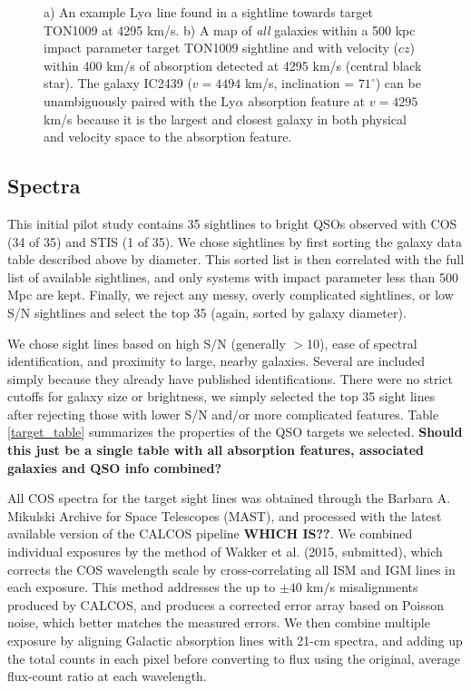 \documentclass[iop]{emulateapj-rtx4}
\begin{document}
\begin{figure}[h!]
  \caption{\small{a) An example Ly$\alpha$ line found in a sightline towards target TON1009 at 4295 km/s. b) A map of \textit{all} galaxies within a 500 kpc impact parameter target TON1009 sightline and with velocity ($cz$) within 400 km/s of absorption detected at 4295 km/s (central black star). The galaxy IC2439 ($v=4494$ km/s, inclination = $71^{\circ}$) can be unambiguously paired with the Ly$\alpha$ absorption feature at $v=4295$ km/s because it is the largest and closest galaxy in both physical and velocity space to the absorption feature.}}
\vspace{5pt}
\end{figure}

\subsection{Spectra}

This initial pilot study contains 35 sightlines to bright QSOs observed with COS (34 of 35) and STIS (1 of 35). We chose sightlines by first sorting the galaxy data table described above by diameter. This sorted list is then correlated with the full list of available sightlines, and only systems with impact parameter less than 500 Mpc are kept. Finally, we reject any messy, overly complicated sightlines, or low S/N sightlines and select the top 35 (again, sorted by galaxy diameter). 

We chose sight lines based on high S/N (generally $>$10), ease of spectral identification, and proximity to large, nearby galaxies. Several are included simply because they already have published identifications. There were no strict cutoffs for galaxy size or brightness, we simply selected the top 35 sight lines after rejecting those with lower S/N and/or more complicated features. Table \ref{target_table} summarizes the properties of the QSO targets we selected. \textbf{Should this just be a single table with all absorption features, associated galaxies and QSO info combined?}

All COS spectra for the target sight lines was obtained through the Barbara A. Mikulski Archive for Space Telescopes (MAST), and processed with the latest available version of the CALCOS pipeline \textbf{WHICH IS??}. We combined individual exposures by the method of Wakker et al. (2015, submitted), which corrects the COS wavelength scale by cross-correlating all ISM and IGM lines in each exposure. This method addresses the up to $\pm40$ km/s misalignments produced by CALCOS, and produces a corrected error array based on Poisson noise, which better matches the measured errors. We then combine multiple exposure by aligning Galactic absorption lines with 21-cm spectra, and adding up the total counts in each pixel before converting to flux using the original, average flux-count ratio at each wavelength.
\end{document}
